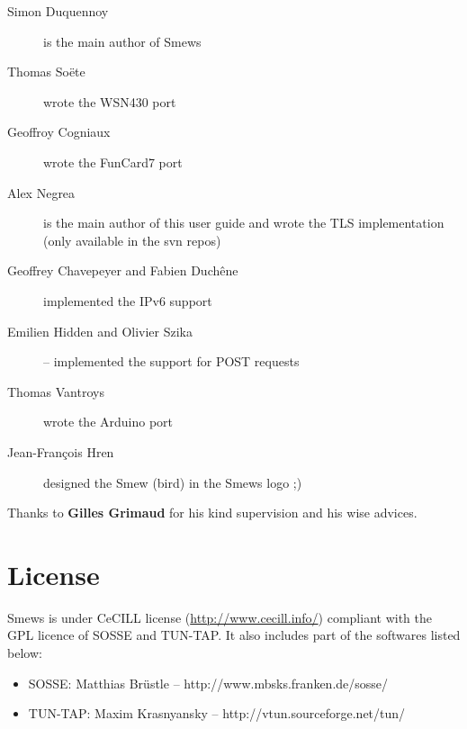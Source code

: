 \documentclass{report}
\begin{document}
\begin{description}
 \item[Simon Duquennoy] is the main author of Smews
 \item[Thomas So\"{e}te] wrote the WSN430 port
 \item[Geoffroy Cogniaux] wrote the FunCard7 port
 \item[Alex Negrea] is the main author of this user guide and wrote the TLS
implementation (only available in the svn repos)
 \item[Geoffrey Chavepeyer \textnormal{and} Fabien Duchêne] implemented the IPv6
support
 \item[Emilien Hidden \textnormal{and} Olivier Szika] -- implemented the support
for POST requests
 \item[Thomas Vantroys] wrote the Arduino port
 \item[Jean-Fran\c{c}ois Hren] designed the Smew (bird) in the Smews logo ;)
\end{description}
Thanks to \textbf{Gilles Grimaud} for his kind supervision and his wise advices.

\section{License}

Smews is under CeCILL license (\url{http://www.cecill.info/}) compliant with the GPL licence of SOSSE and TUN-TAP. It also includes part of the softwares listed below:
\begin{itemize}
 \item SOSSE: Matthias Br\"{u}stle -- http://www.mbsks.franken.de/sosse/
 \item TUN-TAP: Maxim Krasnyansky -- http://vtun.sourceforge.net/tun/
\end{itemize}
\end{document}

